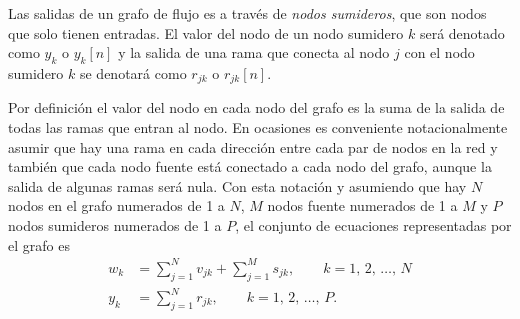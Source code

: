 \documentclass[a4paper]{report}
\begin{document}
Las salidas de un grafo de flujo es a través de \emph{nodos sumideros}, que son nodos que solo tienen entradas. El valor del nodo de un nodo sumidero \(k\) será denotado como \(y_k\) o \(y_k[n]\) y la salida de una rama que conecta al nodo \(j\) con el nodo sumidero \(k\) se denotará como \(r_{jk}\) o \(r_{jk}[n]\).

Por definición el valor del nodo en cada nodo del grafo es la suma de la salida de todas las ramas que entran al nodo. En ocasiones es conveniente notacionalmente asumir que hay una rama en cada dirección entre cada par de nodos en la red y también que cada nodo fuente está conectado a cada nodo del grafo, aunque la salida de algunas ramas será nula. Con esta notación y asumiendo que hay \(N\) nodos en el grafo numerados de 1 a \(N\), \(M\) nodos fuente numerados de 1 a \(M\) y \(P\) nodos sumideros numerados de 1 a \(P\), el conjunto de ecuaciones representadas por el grafo es
\begin{equation}\label{eq:structures_flow_graph_general_equations}
 \begin{aligned}
   w_k&=\sum_{j=1}^N v_{jk}+\sum_{j=1}^M s_{jk},\qquad k=1,\,2,\,\dots,\,N\\
   y_k&=\sum_{j=1}^N r_{jk},\qquad k=1,\,2,\,\dots,\,P.
 \end{aligned}
\end{equation}
\end{document}
